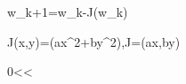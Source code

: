 \mathbf w_{k+1}=\mathbf w_k-\eta\nabla J(\mathbf w_k)

J(x,y)=(ax^2+by^2),\qquad \nabla J=(ax,by)

0<\eta<
